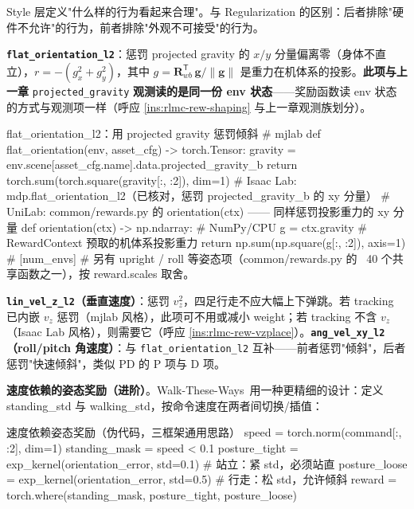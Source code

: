 Style 层定义"什么样的行为看起来合理"。与 Regularization 的区别：后者排除"硬件不允许"的行为，前者排除"外观不可接受"的行为。

\textbf{\texttt{flat\_orientation\_l2}}：惩罚 projected gravity 的 $x/y$ 分量偏离零（身体不直立），$r=-(g_x^2+g_y^2)$，其中 $g=\mathbf R_{wb}^{\mathsf T}\,\mathbf g/\lVert\mathbf g\rVert$ 是重力在机体系的投影。\textbf{此项与上一章} \verb|projected_gravity| \textbf{观测读的是同一份 env 状态}——奖励函数读 env 状态的方式与观测项一样（呼应 \cref{ins:rlmc-rew-shaping} 与上一章观测族划分）。

\begin{codebox}[Python]{flat\_orientation\_l2：用 projected gravity 惩罚倾斜}
# mjlab
def flat_orientation(env, asset_cfg) -> torch.Tensor:
    gravity = env.scene[asset_cfg.name].data.projected_gravity_b
    return torch.sum(torch.square(gravity[:, :2]), dim=1)
# Isaac Lab: mdp.flat_orientation_l2（已核对，惩罚 projected_gravity_b 的 xy 分量）
# UniLab: common/rewards.py 的 orientation(ctx) —— 同样惩罚投影重力的 xy 分量
def orientation(ctx) -> np.ndarray:                      # NumPy/CPU
    g = ctx.gravity                                      # RewardContext 预取的机体系投影重力
    return np.sum(np.square(g[:, :2]), axis=1)           # [num_envs]
# 另有 upright / roll 等姿态项（common/rewards.py 的 ~40 个共享函数之一），按 reward.scales 取舍。
\end{codebox}

\textbf{\texttt{lin\_vel\_z\_l2}（垂直速度）}：惩罚 $v_z^2$，四足行走不应大幅上下弹跳。若 tracking 已内嵌 $v_z$ 惩罚（mjlab 风格），此项可不用或减小 weight；若 tracking 不含 $v_z$（Isaac Lab 风格），则需要它（呼应 \cref{ins:rlmc-rew-vzplace}）。\textbf{\texttt{ang\_vel\_xy\_l2}（roll/pitch 角速度）}：与 \verb|flat_orientation_l2| 互补——前者惩罚"倾斜"，后者惩罚"快速倾斜"，类似 PD 的 P 项与 D 项。

\textbf{速度依赖的姿态奖励（进阶）}。Walk-These-Ways\,\cite{margolis2022walk} 用一种更精细的设计：定义 standing\_std 与 walking\_std，按命令速度在两者间切换/插值：

\begin{codebox}[Python]{速度依赖姿态奖励（伪代码，三框架通用思路）}
speed = torch.norm(command[:, :2], dim=1)
standing_mask = speed < 0.1
posture_tight = exp_kernel(orientation_error, std=0.1)   # 站立：紧 std，必须站直
posture_loose = exp_kernel(orientation_error, std=0.5)   # 行走：松 std，允许倾斜
reward = torch.where(standing_mask, posture_tight, posture_loose)
\end{codebox}

